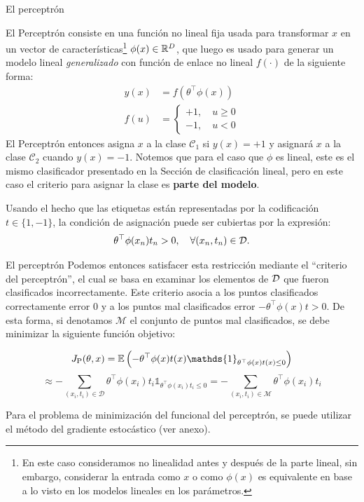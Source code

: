 \documentclass[9pt]{beamer}
\begin{document}
\begin{frame}{El perceptrón}

El Perceptrón consiste en una función no lineal fija usada para transformar $x$ en un vector de características\footnote{En este caso consideramos no linealidad antes y después de la parte lineal, sin embargo, considerar la entrada como $x$ o  como $\phi(x)$ es  equivalente en base a lo  visto en los modelos lineales en los parámetros. } $\phi(x)\in\mathbb{R}^D$, que luego es usado para generar un modelo lineal \emph{generalizado} con función de enlace no lineal $f(\cdot)$ de la siguiente forma:
\begin{align*}
  y(x) &= f(\theta^\top\phi(x))\\
  f(u) &= \left\{\begin{matrix}
  +1,\quad u\geq 0\\
  -1,\quad u<0
  \end{matrix}\right.
\end{align*} \pause
El Perceptrón entonces asigna $x$ a la clase $\mathcal{C}_1$ si $y(x)=+1$ y asignará $x$ a la clase $\mathcal{C}_2$ cuando $y(x)=-1$. Notemos que  para  el caso que $\phi$ es lineal, este es el mismo clasificador presentado en la Sección de clasificación lineal, pero en este caso el criterio para asignar la clase es \textbf{parte del modelo}. \pause

Usando el hecho que las etiquetas están representadas por la  codificación $t\in\{1,-1\}$, la condición de asignación puede ser cubiertas por la expresión:
\begin{equation*}
  \theta^\top\phi(x_n)t_n > 0,\quad \forall (x_n,t_n) \in {\mathcal D}.
\end{equation*}

\end{frame}

\begin{frame}{El perceptrón}
Podemos entonces satisfacer esta restricción mediante el ``criterio del perceptrón'', el cual se basa en examinar  los elementos de ${\mathcal D}$ que fueron clasificados incorrectamente. Este criterio asocia a los puntos clasificados correctamente error 0 y a los puntos mal clasificados error $-\theta^\top\phi(x)t>0$. De esta forma, si denotamos $\mathcal{M}$ el conjunto de puntos mal clasificados, se debe minimizar la siguiente función objetivo: \pause 

\begin{equation*}
  J_\text{P}(\theta,x) = \E\left(-\theta^\top\phi(x)t(x)\mathds{1}_{\theta^\top\phi(x)t(x)\leq 0} \right) 
\end{equation*} \pause
\begin{equation*}
\approx -\sum_{(x_i,t_i)\in \mathcal{D}}\theta^\top\phi(x_i)t_i \mathds{1}_{\theta^\top\phi(x_i)t_i\leq 0} = -\sum_{(x_i,t_i)\in \mathcal{M}}\theta^\top\phi(x_i)t_i
\end{equation*} 

Para el problema de minimización del funcional del perceptrón, se puede utilizar el método del gradiente estocástico (ver anexo). 

\end{frame}
\end{document}
